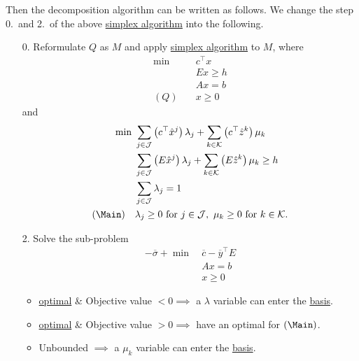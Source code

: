 Then the decomposition algorithm can be written as follows. We change the step 0.\ and 2.\ of the above \hyperref[algo:simplex-algorithm]{simplex algorithm} into the following.
\begin{enumerate}
	\item[0.] Reformulate \(Q\) as \(M\) and apply \hyperref[algo:simplex-algorithm]{simplex algorithm} to \(M\), where
	      \[
		      \begin{aligned}
			      \min~    & c^{\top}x \\
			               & Ex \geq h \\
			               & Ax = b    \\
			      (Q)\quad & x\geq 0
		      \end{aligned}
	      \]
	      and
	      \[
		      \begin{aligned}
			      \min~        & \sum\limits_{j\in\mathcal{J}}\left(c^{\top}\hat{x}^j\right)\lambda_{j} + \sum\limits_{k\in\mathcal{K}}\left(c^{\top} \hat{z}^k  \right)\mu_k \\
			                   & \sum\limits_{j\in\mathcal{J}}\left(E\hat{x}^j\right)\lambda_{j} + \sum\limits_{k\in\mathcal{K}}\left(E \hat{z}^k \right)\mu_k \geq h         \\
			                   & \sum\limits_{j\in\mathcal{J}}\lambda_{j} = 1                                                                                                 \\
			      (\Main)\quad & \lambda_{j}\geq 0 \text{ for }j\in\mathcal{J},\ \mu_k\geq 0 \text{ for }k\in\mathcal{K}.
		      \end{aligned}
	      \]
	\item[2.] Solve the sub-problem
	      \[
		      \begin{aligned}
			      -\overline{\sigma}+\min~ & \overline{c} - \overline{y}^{\top}E \\
			                               & Ax = b                              \\
			                               & x\geq 0
		      \end{aligned}
	      \]
	      \begin{itemize}
		      \item \hyperref[def:optimal-solution]{optimal} \& Objective value \(<0 \implies\) a \(\lambda\) variable can enter the \hyperref[def:basis]{basis}.
		      \item \hyperref[def:optimal-solution]{optimal} \& Objective value \(>0 \implies\) have an optimal for \((\Main)\).
		      \item Unbounded \(\implies\) a \(\mu_k\) variable can enter the \hyperref[def:basis]{basis}.
	      \end{itemize}
\end{enumerate}

